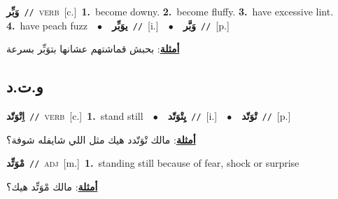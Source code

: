 \documentclass[10pt,a4paper,twoside]{article} %
\begin{document}
\begin{multicols}{2}
{{{{\setlength\topsep{0pt}\textbf{\foreignlanguage{arabic}{وَبِّر}}\ {\color{gray}\texttt{//}\color{black}}\ \textsc{verb}\ [c.]\ \textbf{1.}~become downy.  \textbf{2.}~become fluffy.  \textbf{3.}~have excessive lint.  \textbf{4.}~have peach fuzz\ \ $\bullet$\ \ \setlength\topsep{0pt}\textbf{\foreignlanguage{arabic}{يوَبِّر}}\ {\color{gray}\texttt{//}\color{black}}\ [i.]\ \ $\bullet$\ \ \setlength\topsep{0pt}\textbf{\foreignlanguage{arabic}{وَبَّر}}\ {\color{gray}\texttt{//}\color{black}}\ [p.]\  \begin{flushright}\color{gray}\foreignlanguage{arabic}{\textbf{\underline{\foreignlanguage{arabic}{أمثلة}}}: بحبش قماشتهم عشانها بتوَبِّر بسرعة}\end{flushright}\color{black}} \vspace{2mm}

\vspace{-3mm}
\subsection*{\color{blue}\foreignlanguage{arabic}{و.ت.د}\color{blue}{}} 

{\setlength\topsep{0pt}\textbf{\foreignlanguage{arabic}{اِتْوَتّد}}\ {\color{gray}\texttt{//}\color{black}}\ \textsc{verb}\ [c.]\ \textbf{1.}~stand still\ \ $\bullet$\ \ \setlength\topsep{0pt}\textbf{\foreignlanguage{arabic}{يِتْوَتّد}}\ {\color{gray}\texttt{//}\color{black}}\ [i.]\ \ $\bullet$\ \ \setlength\topsep{0pt}\textbf{\foreignlanguage{arabic}{تْوَتّد}}\ {\color{gray}\texttt{//}\color{black}}\ [p.]\  \begin{flushright}\color{gray}\foreignlanguage{arabic}{\textbf{\underline{\foreignlanguage{arabic}{أمثلة}}}: مالك تْوَتّدد هيك مثل اللي شايفله شوفة؟}\end{flushright}\color{black}} \vspace{2mm}

{\setlength\topsep{0pt}\textbf{\foreignlanguage{arabic}{مْوَتِّد}}\ {\color{gray}\texttt{//}\color{black}}\ \textsc{adj}\ [m.]\ \textbf{1.}~standing still because of fear, shock or surprise\  \begin{flushright}\color{gray}\foreignlanguage{arabic}{\textbf{\underline{\foreignlanguage{arabic}{أمثلة}}}: مالك مْوَتِّد هيك؟}\end{flushright}\color{black}} \vspace{2mm}

}}}
\end{multicols}
\end{document}
